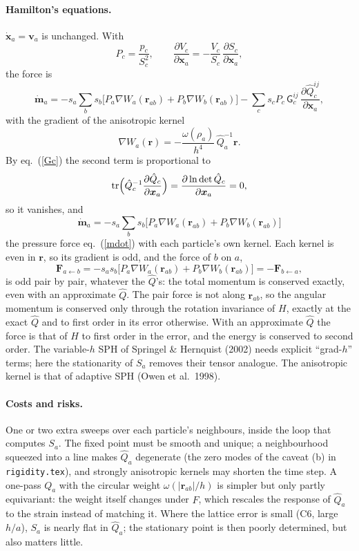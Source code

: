 \documentclass[11pt,aps,preprint,nofootinbib,superscriptaddress,tightenlines]{revtex4-2}
\def\st{\begin{equation}}
\def\stp{\end{equation}}
\def\Eq#1{eq.~(\ref{#1})}
\let\oldparagraph\paragraph
\renewcommand{\paragraph}{\par\bigskip\oldparagraph}
\begin{document}
\paragraph{Hamilton's equations.}  $\dot{\bm x}_a=\bm v_a$ is unchanged.  With
\st
P_c=\frac{p_c}{S_c^2},\qquad
\frac{\partial V_c}{\partial\bm x_a}=-\frac{V_c}{S_c}\,\frac{\partial S_c}{\partial\bm x_a},
\stp
the force is
\st
\dot{\bm m}_a=-s_a\sum_bs_b\big[P_a\nabla W_a(\bm r_{ab})+P_b\nabla W_b(\bm r_{ab})\big]
-\sum_cs_cP_c\,\mathsf G_c^{ij}\,\frac{\partial\hat Q_c^{ij}}{\partial\bm x_a},
\label{mdotaniso}
\stp
with the gradient of the anisotropic kernel
\st
\nabla W_a(\bm r)=-\frac{\omega(\rho_a)}{h^4}\,\hat Q_a^{-1}\bm r .
\stp
By \Eq{Gc} the second term is proportional to
\st
{\rm tr}\Big(\hat Q_c^{-1}\frac{\partial\hat Q_c}{\partial\bm x_a}\Big)
=\frac{\partial\ln\det\hat Q_c}{\partial\bm x_a}=0 ,
\stp
so it vanishes, and
\st
\boxed{\;\dot{\bm m}_a=-s_a\sum_bs_b\big[P_a\nabla W_a(\bm r_{ab})+P_b\nabla W_b(\bm r_{ab})\big]\;}
\label{mdotaniso2}
\stp
the pressure force \Eq{mdot} with each particle's own kernel.  Each kernel is even in
$\bm r$, so its gradient is odd, and the force of $b$ on $a$,
\st
\bm F_{a\leftarrow b}=-s_as_b\big[P_a\nabla W_a(\bm r_{ab})+P_b\nabla W_b(\bm r_{ab})\big]
=-\bm F_{b\leftarrow a},
\stp
is odd pair by pair, whatever the $\hat Q$'s: the total momentum is conserved exactly, even
with an approximate $\hat Q$.  The pair force is not along $\bm r_{ab}$, so the angular momentum
is conserved only through the rotation invariance of $H$, exactly at the exact $\hat Q$ and to
first order in its error otherwise.  With an approximate $\hat Q$ the force is that of $H$ to
first order in the error, and the energy is conserved to second order.  The
variable-$h$ SPH of Springel \& Hernquist (2002) needs explicit ``grad-$h$'' terms; here the
stationarity of $S_a$ removes their tensor analogue.  The anisotropic kernel is that of
adaptive SPH (Owen et al.\ 1998).

\paragraph{Costs and risks.}  One or two extra sweeps over each particle's neighbours, inside
the loop that computes $S_a$.  The
fixed point must be smooth and unique; a neighbourhood squeezed into a line makes $\hat Q_a$
degenerate (the zero modes of the caveat (b) in \texttt{rigidity.tex}), and strongly
anisotropic kernels may shorten the time step.  A one-pass $Q_a$ with the circular weight
$\omega(|\bm r_{ab}|/h)$ is simpler but only partly equivariant: the weight itself changes
under $F$, which rescales the response of $\hat Q_a$ to the strain instead of matching it.
Where the lattice error is small (C6, large $h/a$), $S_a$ is nearly flat in $\hat Q_a$; the
stationary point is then poorly determined, but also matters little.
\end{document}
